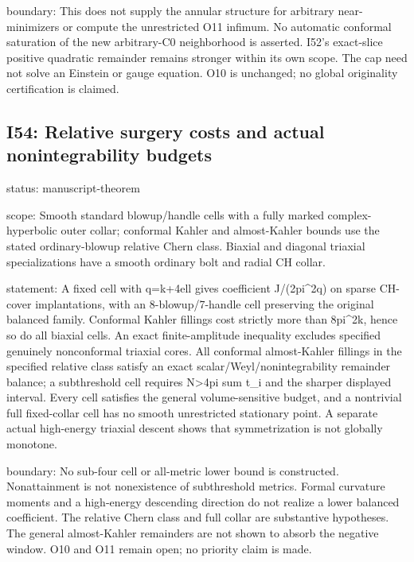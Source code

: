 \documentclass[
  10pt,
]{article}
\begin{document}
boundary: This does not supply the annular structure for arbitrary
near-minimizers or compute the unrestricted O11 infimum. No automatic
conformal saturation of the new arbitrary-C0 neighborhood is asserted.
I52's exact-slice positive quadratic remainder remains stronger within
its own scope. The cap need not solve an Einstein or gauge equation. O10
is unchanged; no global originality certification is claimed.

\hypertarget{i54-relative-surgery-costs-and-actual-nonintegrability-budgets}{%
\subsection{I54: Relative surgery costs and actual nonintegrability
budgets}\label{i54-relative-surgery-costs-and-actual-nonintegrability-budgets}}

status: manuscript-theorem

scope: Smooth standard blowup/handle cells with a fully marked
complex-hyperbolic outer collar; conformal Kahler and almost-Kahler
bounds use the stated ordinary-blowup relative Chern class. Biaxial and
diagonal triaxial specializations have a smooth ordinary bolt and radial
CH collar.

statement: A fixed cell with q=k+4ell gives coefficient J/(2pi\^{}2q) on
sparse CH-cover implantations, with an 8-blowup/7-handle cell preserving
the original balanced family. Conformal Kahler fillings cost strictly
more than 8pi\^{}2k, hence so do all biaxial cells. An exact
finite-amplitude inequality excludes specified genuinely nonconformal
triaxial cores. All conformal almost-Kahler fillings in the specified
relative class satisfy an exact scalar/Weyl/nonintegrability remainder
balance; a subthreshold cell requires N\textgreater4pi sum t\_i and the
sharper displayed interval. Every cell satisfies the general
volume-sensitive budget, and a nontrivial full fixed-collar cell has no
smooth unrestricted stationary point. A separate actual high-energy
triaxial descent shows that symmetrization is not globally monotone.

boundary: No sub-four cell or all-metric lower bound is constructed.
Nonattainment is not nonexistence of subthreshold metrics. Formal
curvature moments and a high-energy descending direction do not realize
a lower balanced coefficient. The relative Chern class and full collar
are substantive hypotheses. The general almost-Kahler remainders are not
shown to absorb the negative window. O10 and O11 remain open; no
priority claim is made.
\end{document}
